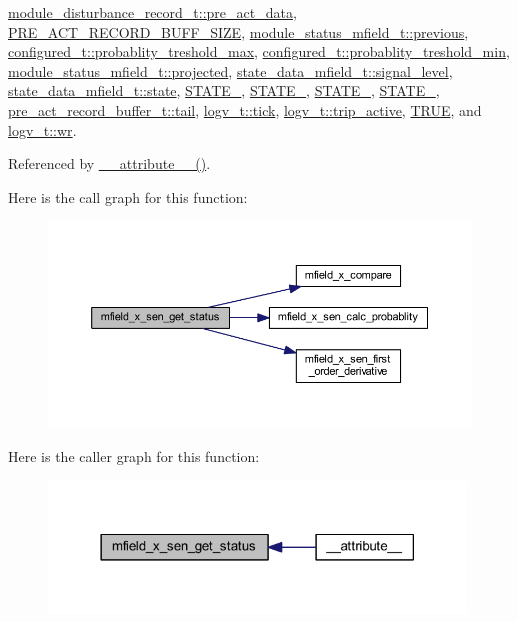 \hyperlink{a00022_source_l00176}{module\+\_\+disturbance\+\_\+record\+\_\+t\+::pre\+\_\+act\+\_\+data}, \hyperlink{a00022_source_l00013}{P\+R\+E\+\_\+\+A\+C\+T\+\_\+\+R\+E\+C\+O\+R\+D\+\_\+\+B\+U\+F\+F\+\_\+\+S\+I\+Z\+E}, \hyperlink{a00019_source_l00110}{module\+\_\+status\+\_\+mfield\+\_\+t\+::previous}, \hyperlink{a00021_source_l00202}{configured\+\_\+t\+::probablity\+\_\+treshold\+\_\+max}, \hyperlink{a00021_source_l00201}{configured\+\_\+t\+::probablity\+\_\+treshold\+\_\+min}, \hyperlink{a00019_af2267fb093fb5dcaa006a570a6da3b6b}{module\+\_\+status\+\_\+mfield\+\_\+t\+::projected}, \hyperlink{a00019_source_l00101}{state\+\_\+data\+\_\+mfield\+\_\+t\+::signal\+\_\+level}, \hyperlink{a00019_source_l00103}{state\+\_\+data\+\_\+mfield\+\_\+t\+::state}, \hyperlink{a00021_source_l00149}{S\+T\+A\+T\+E\+\_}, \hyperlink{a00021_source_l00150}{S\+T\+A\+T\+E\+\_}, \hyperlink{a00021_source_l00151}{S\+T\+A\+T\+E\+\_}, \hyperlink{a00021_source_l00152}{S\+T\+A\+T\+E\+\_}, \hyperlink{a00022_source_l00144}{pre\+\_\+act\+\_\+record\+\_\+buffer\+\_\+t\+::tail}, \hyperlink{a00021_source_l00247}{logv\+\_\+t\+::tick}, \hyperlink{a00021_source_l00248}{logv\+\_\+t\+::trip\+\_\+active}, \hyperlink{a00040_source_l00084}{T\+R\+U\+E}, and \hyperlink{a00021_source_l00249}{logv\+\_\+t\+::wr}.



Referenced by \hyperlink{a00041_source_l00025}{\+\_\+\+\_\+attribute\+\_\+\+\_\+()}.



Here is the call graph for this function\+:\nopagebreak
\begin{figure}[H]
\begin{center}
\leavevmode
\includegraphics[width=350pt]{dd/da2/a00019_a3a46d0e69b27b3566e6d8465cf7a8b0a_cgraph}
\end{center}
\end{figure}




Here is the caller graph for this function\+:\nopagebreak
\begin{figure}[H]
\begin{center}
\leavevmode
\includegraphics[width=314pt]{dd/da2/a00019_a3a46d0e69b27b3566e6d8465cf7a8b0a_icgraph}
\end{center}
\end{figure}


